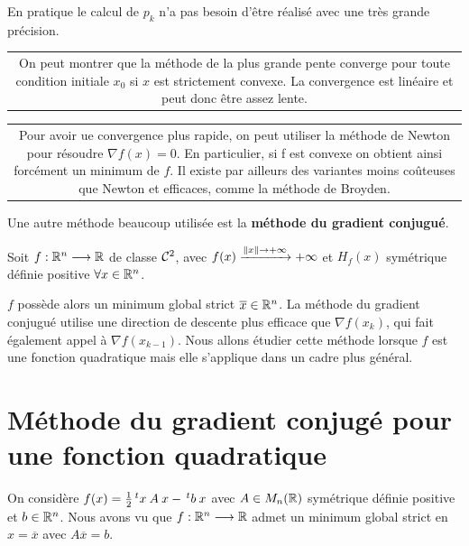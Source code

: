 \begin{remark}
    En pratique le calcul de $p_k$ n'a pas besoin d'être réalisé avec
    une très grande précision.
\end{remark}

\noindent
\begin{tabular}{||c}
\begin{minipage}[c]{15cm}
        On peut montrer que la méthode de la plus grande pente converge pour toute
        condition initiale $x_0$ si $x$ est strictement convexe. La convergence
        est linéaire et peut donc être assez lente.
    \end{minipage}
\end{tabular}

\vspace{0.3cm}

\noindent
\begin{tabular}{||c}
    \begin{minipage}[c]{15cm}
        Pour avoir ue convergence plus rapide, on peut utiliser la méthode de
        Newton pour résoudre $\nabla f(x) = 0$. En particulier, si f est
        convexe on obtient ainsi forcément un minimum de $f$. Il existe par
        ailleurs des variantes moins coûteuses que Newton et efficaces, comme
        la méthode de Broyden.
    \end{minipage}
\end{tabular}

Une autre méthode beaucoup utilisée est la \textbf{méthode du gradient conjugué}.

Soit $f : \mathbb{R}^n \longrightarrow \mathbb{R}$ de classe $\mathcal{C}^2$, avec $f(x) \xrightarrow{\left\lVert x\right\rVert \to +\infty} +\infty$
et $H_f(x)$ symétrique définie positive $\forall x \in \mathbb{R}^n$.

$f$ possède alors un minimum global strict $\overline{x} \in \mathbb{R}^n$. La méthode
du gradient conjugué utilise une direction de descente plus efficace que
$\nabla f(x_k)$, qui fait également appel à $\nabla f(x_{k-1})$. Nous allons
étudier cette méthode lorsque $f$ est une fonction quadratique mais elle
s'applique dans un cadre plus général.

\section{Méthode du gradient conjugé pour une fonction quadratique}

On considère $f(x) = \frac{1}{2} \,^tx \: A \: x - \,^tb \: x$ avec
$A \in M_n(\mathbb{R})$ symétrique définie positive et $b \in \mathbb{R}^n$. Nous avons
vu que $f : \mathbb{R}^n \longrightarrow \mathbb{R}$ admet un minimum global strict en $x = \overline{x}$ avec $A \overline{x} = b$.

